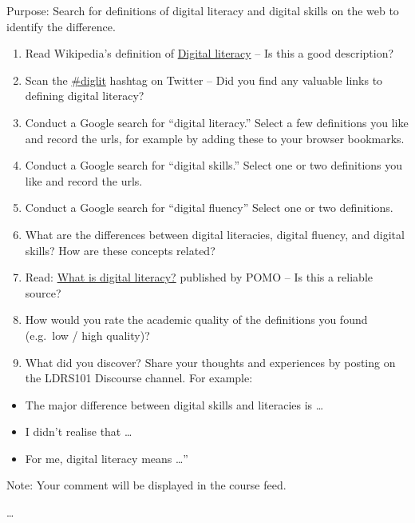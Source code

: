 \documentclass[
]{book}
\providecommand{\tightlist}{%
  \setlength{\itemsep}{0pt}\setlength{\parskip}{0pt}}
\theoremstyle{definition}
\theoremstyle{definition}
\theoremstyle{definition}
\theoremstyle{definition}
\theoremstyle{remark}
\begin{document}
\begin{reflect}
Purpose: Search for definitions of digital literacy and digital skills on the web to identify the difference.

\begin{enumerate}
\def\labelenumi{\arabic{enumi}.}
\tightlist
\item
  Read Wikipedia's definition of \href{https://en.wikipedia.org/wiki/Digital_literacy}{Digital literacy} -- Is this a good description?
\item
  Scan the \href{https://twitter.com/i/flow/login?redirect_after_login=\%2Fhashtag\%2Fdiglit\%3Fs\%3D03}{\#diglit} hashtag on Twitter -- Did you find any valuable links to defining digital literacy?
\item
  Conduct a Google search for ``digital literacy.'' Select a few definitions you like and record the urls, for example by adding these to your browser bookmarks.
\item
  Conduct a Google search for ``digital skills.'' Select one or two definitions you like and record the urls.
\item
  Conduct a Google search for ``digital fluency'' Select one or two definitions.
\item
  What are the differences between digital literacies, digital fluency, and digital skills? How are these concepts related?
\item
  Read: \href{http://pomo.com.au/blog/digital-literacy/}{What is digital literacy?} published by POMO -- Is this a reliable source?
\item
  How would you rate the academic quality of the definitions you found (e.g.~low / high quality)?
\item
  What did you discover? Share your thoughts and experiences by posting on the LDRS101 Discourse channel. For example:
\end{enumerate}

\begin{itemize}
\tightlist
\item
  The major difference between digital skills and literacies is \ldots{}
\item
  I didn't realise that \ldots{}
\item
  For me, digital literacy means \ldots''
\end{itemize}

Note: Your comment will be displayed in the course feed.

\ldots{}

\hypertarget{digital-skills-versus-literacies}{%
}
\end{reflect}
\end{document}
